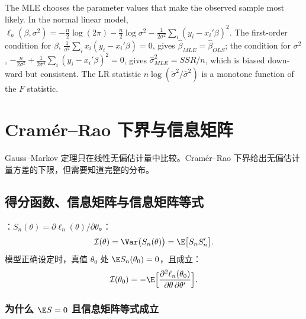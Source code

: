 \begin{english}
The MLE chooses the parameter values that make the observed sample most likely. In the normal linear model, $\ell_n(\beta,\sigma^2)=-\frac n2\log(2\pi)-\frac n2\log\sigma^2-\frac1{2\sigma^2}\sum_i(y_i-x_i'\beta)^2$. The first-order condition for $\beta$, $\frac1{\sigma^2}\sum_ix_i(y_i-x_i'\beta)=0$, gives $\hat\beta_{MLE}=\hat\beta_{OLS}$; the condition for $\sigma^2$, $-\frac n{2\sigma^2}+\frac1{2\sigma^4}\sum_i(y_i-x_i'\beta)^2=0$, gives $\hat\sigma^2_{MLE}=SSR/n$, which is biased downward but consistent. The LR statistic $n\log(\tilde\sigma^2/\hat\sigma^2)$ is a monotone function of the $F$ statistic.
\end{english}

\section{Cramér--Rao 下界与信息矩阵}\label{sec:U04-cr}

Gauss--Markov 定理只在线性无偏估计量中比较。Cramér--Rao 下界给出无偏估计量方差的下限，但需要知道完整的分布。

\subsection{得分函数、信息矩阵与信息矩阵等式}

\begin{defn}[得分、信息矩阵与信息矩阵等式]\label{def:U04-info}
：$S_n(\theta)=\partial\ell_n(\theta)/\partial\theta$。：
\[
\mathcal I(\theta)=\Var\big(S_n(\theta)\big)=\E\big[S_nS_n'\big].
\]
模型正确设定时，真值 $\theta_0$ 处 $\E S_n(\theta_0)=0$，且成立：
\[
\mathcal I(\theta_0)=-\E\Big[\frac{\partial^2\ell_n(\theta_0)}{\partial\theta\,\partial\theta'}\Big].
\]
\end{defn}

\subsubsection{为什么 \texorpdfstring{$\E S=0$}{E S = 0} 且信息矩阵等式成立}

